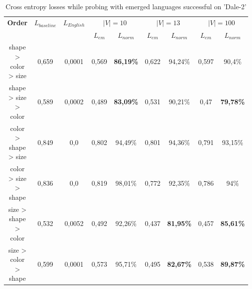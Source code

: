 \begin{table}[h]
    \centering
    \begin{tabular}{c|cc|cc|cc|cc}
        \toprule
        \textbf{Order}          & $L_{baseline}$ & $L_{English}$ & \multicolumn{2}{c}{$|V| = 10$} & \multicolumn{2}{c}{$|V| = 13$} & \multicolumn{2}{c}{$|V| = 100$}                                                      \\\cmidrule(lr){4-5}\cmidrule(lr){6-7}\cmidrule(lr){8-9}
                                &                &               & $L_{em}$                       & $L_{norm}$                     & $L_{em}$                        & $L_{norm}$         & $L_{em}$ & $L_{norm}$         \\\midrule
        {shape > color > size}  & {0,659}        & {0,0001}      & {0,569}                        & \textbf{86,19\%}               & {0,622}                         & {94,24\%}          & {0,597}  & {90,4\%}           \\
        {shape > size > color}  & {0,589}        & {0,0002}      & {0,489}                        & \textbf{83,09\%}               & {0,531}                         & {90,21\%}          & {0,47}   & {\textbf{79,78\%}} \\
        {color > shape > size}  & {0,849}        & {0,0}         & {0,802}                        & 94,49\%                        & {0,801}                         & {94,36\%}          & {0,791}  & {93,15\%}          \\
        {color  > size > shape} & {0,836}        & {0,0}         & {0,819}                        & 98,01\%                        & {0,772}                         & {92,35\%}          & {0,786}  & {94\%}             \\
        {size > shape > color}  & {0,532}        & {0,0052}      & {0,492}                        & 92,26\%                        & {0,437}                         & {\textbf{81,95\%}} & {0,457}  & {\textbf{85,61\%}} \\
        {size > color > shape}  & {0,599}        & {0,0001}      & {0,573}                        & 95,71\%                        & {0,495}                         & {\textbf{82,67\%}} & {0,538}  & {\textbf{89,87\%}} \\
        \bottomrule
    \end{tabular}
    \caption{Cross entropy losses while probing with emerged languages successful on 'Dale-2'}
    \label{tab:probing_discrimnator_language}
\end{table}

